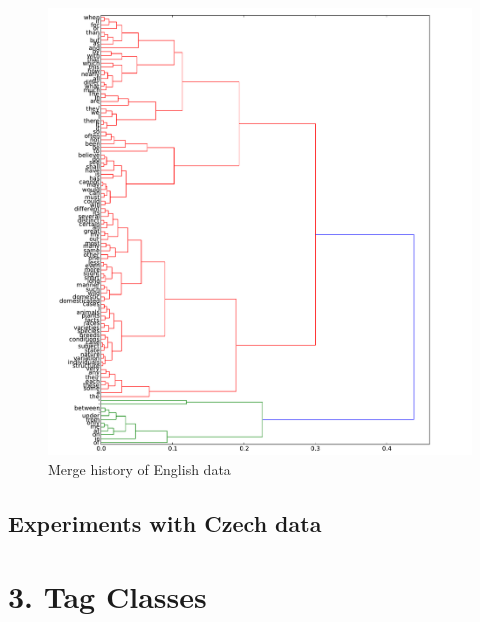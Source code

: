 \documentclass[12pt,a4paper]{article}
\begin{document}
\begin{figure}
  \centering
  \includegraphics[width=\textwidth]{dendrogram_en}
  \caption{Merge history of English data}
\end{figure}


\subsection{Experiments with Czech data}




\section{3. Tag Classes}
\end{document}

